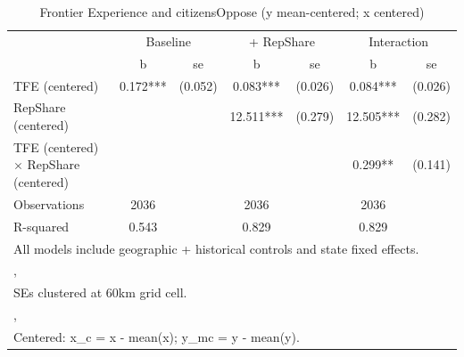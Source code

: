 \begin{table}[htbp]\centering
\def\sym#1{\ifmmode^{#1}\else\(^{#1}\)\fi}
\caption{Frontier Experience and citizensOppose (y mean-centered; x centered)}
\begin{tabular}{l*{3}{cc}}
\toprule
                &\multicolumn{2}{c}{Baseline}&\multicolumn{2}{c}{ + RepShare}&\multicolumn{2}{c}{Interaction}\\
                &        b   &       se&        b   &       se&        b   &       se\\
\midrule
TFE (centered)  &    0.172***&  (0.052)&    0.083***&  (0.026)&    0.084***&  (0.026)\\
RepShare (centered)&            &         &   12.511***&  (0.279)&   12.505***&  (0.282)\\
TFE (centered) $\times$ RepShare (centered)&            &         &            &         &    0.299** &  (0.141)\\
\midrule
Observations    &     2036   &         &     2036   &         &     2036   &         \\
R-squared       &    0.543   &         &    0.829   &         &    0.829   &         \\
\bottomrule
\multicolumn{7}{l}{\footnotesize All models include geographic + historical controls and state fixed effects.}\\
\multicolumn{7}{l}{\footnotesize ,}\\
\multicolumn{7}{l}{\footnotesize SEs clustered at 60km grid cell.}\\
\multicolumn{7}{l}{\footnotesize ,}\\
\multicolumn{7}{l}{\footnotesize Centered: x\_c = x - mean(x); y\_mc = y - mean(y).}\\
\end{tabular}
\end{table}
